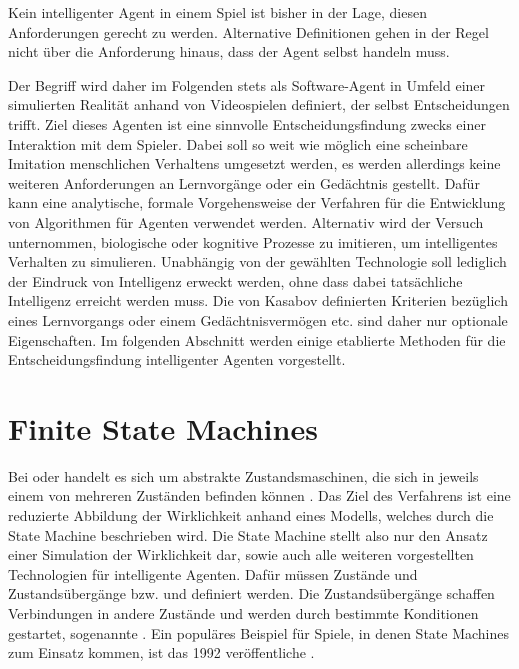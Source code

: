 Kein intelligenter Agent in einem Spiel ist bisher in der Lage, diesen Anforderungen gerecht zu werden. Alternative Definitionen gehen in der Regel nicht über die Anforderung hinaus, dass der Agent selbst handeln muss.

Der Begriff  wird daher im Folgenden stets als Software-Agent in Umfeld einer simulierten Realität anhand von Videospielen definiert, der selbst Entscheidungen trifft. Ziel dieses Agenten ist eine sinnvolle Entscheidungsfindung zwecks einer Interaktion mit dem Spieler. Dabei soll so weit wie möglich eine scheinbare Imitation menschlichen Verhaltens umgesetzt werden, es werden allerdings keine weiteren Anforderungen an Lernvorgänge oder ein Gedächtnis gestellt. Dafür kann eine analytische, formale Vorgehensweise der Verfahren für die Entwicklung von Algorithmen für Agenten verwendet werden. Alternativ wird der Versuch unternommen, biologische oder kognitive Prozesse zu imitieren, um intelligentes Verhalten zu simulieren. Unabhängig von der gewählten Technologie soll lediglich der Eindruck von Intelligenz erweckt werden, ohne dass dabei tatsächliche Intelligenz erreicht werden muss. Die von Kasabov definierten Kriterien bezüglich eines Lernvorgangs oder einem Gedächtnisvermögen etc. sind daher nur optionale Eigenschaften.
Im folgenden Abschnitt werden einige etablierte Methoden für die Entscheidungsfindung intelligenter Agenten vorgestellt.


\section{Finite State Machines}
Bei  oder  handelt es sich um abstrakte Zustandsmaschinen, die sich in jeweils einem von mehreren Zuständen befinden können \cite{ai_for_game_devs} \cite{rich_basic_game_ai_course} \cite{cmsc_425} \cite{state_machine_flora_game} \cite{game_ai_by_example}. Das Ziel des Verfahrens ist eine reduzierte Abbildung der Wirklichkeit anhand eines Modells, welches durch die State Machine beschrieben wird. Die State Machine stellt also nur den Ansatz einer Simulation der Wirklichkeit dar, sowie auch alle weiteren vorgestellten Technologien für intelligente Agenten. Dafür müssen Zustände und Zustandsübergänge bzw.  und  definiert werden. Die Zustandsübergänge schaffen Verbindungen in andere Zustände und werden durch bestimmte Konditionen gestartet, sogenannte . Ein populäres Beispiel für Spiele, in denen State Machines zum Einsatz kommen, ist das 1992 veröffentliche  \cite{wolfenstein}.


